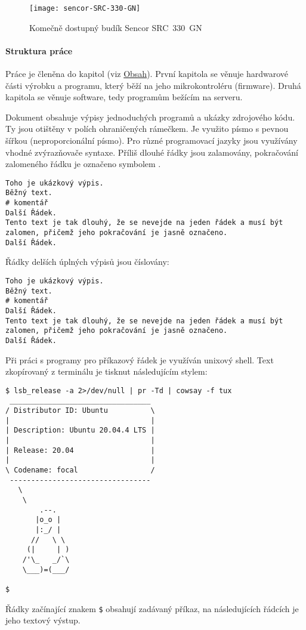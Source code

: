 \begin{figure}[htbp]
    \centering
    \texttt{[image: sencor-SRC-330-GN]}
    \caption{Komečně dostupný budík Sencor SRC~330~GN}
    \label{fig:sencor}
\end{figure}


\paragraph{Struktura práce}
Práce je členěna do kapitol (viz \hyperref[toc]{Obsah}). První kapitola se
věnuje hardwarové části výrobku a programu, který běží na jeho mikrokontroléru
(firmware). Druhá kapitola se věnuje software, tedy programům bežícím na
serveru.

Dokument obsahuje výpisy jednoduchých programů a ukázky zdrojového kódu.
Ty jsou otištěny v polích ohraničených rámečkem. Je využito písmo s pevnou
šířkou (neproporcionální písmo). Pro různé programovací jazyky jsou využívány
vhodné zvýrazňovače syntaxe. Příliš dlouhé řádky jsou zalamovány, pokračování
zalomeného řádku je označeno symbolem \lstpostbreak{}.

\begin{lstlisting}[language=hashcomment]
Toho je ukázkový výpis.
Běžný text.
# komentář
Další Řádek.
Tento text je tak dlouhý, že se nevejde na jeden řádek a musí být zalomen, přičemž jeho pokračování je jasně označeno.
Další Řádek.
\end{lstlisting}

Řádky delších úplných výpisů jsou číslovány:
\begin{lstlisting}[language=hashcomment,style=numbers]
Toho je ukázkový výpis.
Běžný text.
# komentář
Další Řádek.
Tento text je tak dlouhý, že se nevejde na jeden řádek a musí být zalomen, přičemž jeho pokračování je jasně označeno.
Další Řádek.
\end{lstlisting}

Při práci s programy pro příkazový řádek je využíván unixový shell.
Text zkopírovaný z terminálu je tisknut následujícím stylem:
\begin{lstlisting}[style=terminal]
$ lsb_release -a 2>/dev/null | pr -Td | cowsay -f tux
 _________________________________
/ Distributor ID: Ubuntu          \
|                                 |
| Description: Ubuntu 20.04.4 LTS |
|                                 |
| Release: 20.04                  |
|                                 |
\ Codename: focal                 /
 ---------------------------------
   \
    \
        .--.
       |o_o |
       |:_/ |
      //   \ \
     (|     | )
    /'\_   _/`\
    \___)=(___/

$
\end{lstlisting}
Řádky začínající znakem \texttt{\$} obsahují zadávaný příkaz, na následujících
řádcích je jeho textový výstup.

